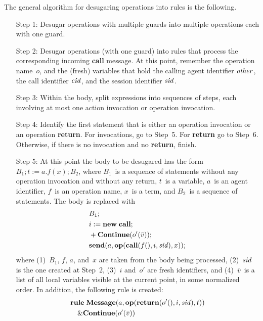 \documentclass[a4paper,12pt,oneside,fleqn]{book} %
\begin{document}
{The general algorithm for desugaring operations into rules is the
following.
\begin{itemize}
\item[Step 1:]
  Desugar operations with multiple guards into multiple operations each
  with one guard.
\item[Step 2:]
  Desugar operations (with one guard) into rules that process the
  corresponding incoming {\bf call} message. At this point, remember the
  operation name~$o$, and the (fresh) variables that hold the calling agent
  identifier $\it other$, the call identifier $\it cid$, and the session
  identifier $\it sid$.
\item[Step 3:]
  Within the body, split expressions into sequences of steps, each
  involving at most one action invocation or operation invocation.
\item[Step 4:]
  Identify the first statement that is either an operation invocation or an
  operation {\bf return}. For invocations, go to Step~5. For {\bf return}
  go to Step~6. Otherwise, if there is no invocation and no {\bf return},
  finish.
\item[Step 5:]
  At this point the body to be desugared has the form $B_1;t:=a.f(x); B_2$,
  where $B_1$~is a sequence of statements without any operation invocation
  and without any return, $t$~is a variable, $a$~is an agent identifier,
  $f$~is an operation name, $x$~is a term, and $B_2$~is a sequence of
  statements. The body is replaced with
\begin{align}
\begin{aligned}
&B_1; \\
&i:={\bf new}\;{\bf call}; \\
&+{\bf Continue}(o'(\bar v)); \\
&{\bf send}(a, {\bf op}({\bf call}(f(), i, {\it sid}), x));
\end{aligned}
\end{align}
  where (1)~$B_1$, $f$, $a$, and~$x$ are taken from the body being
  processed, (2)~$\it sid$ is the one created at Step~2, (3)~$i$ and~$o'$
  are fresh identifiers, and (4)~$\bar v$~is a list of all local variables
  visible at the current point, in some normalized order. In addition, the
  following rule is created:
\begin{align}
\begin{aligned}
&{\bf rule}\;{\bf Message}(a,{\bf op}({\bf return}(o'(),i,{\it sid}), t))\\
&\quad\& {\bf Continue}(o'(\bar v))\\

\end{aligned}
\end{align}
\end{itemize}}
\end{document}
